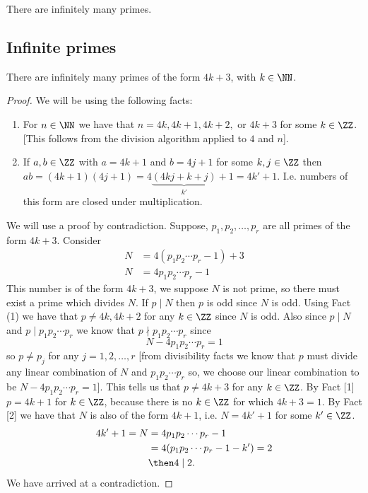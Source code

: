 \documentclass[12pt, a4paper]{article}
\begin{document}
\begin{theorem}[Euclid]
    There are infinitely many primes.
\end{theorem}

\subsection{Infinite primes}

\begin{proposition}
    There are infinitely many primes of the form \(4k+3\), with \(k \in \NN\).
\end{proposition}

\begin{proof}
    We will be using the following facts:
    \begin{enumerate}
        \item For \(n \in \NN\) we have that \(n=4k,4k+1,4k+2,\) or \(4k+3\) for some \(k\in \ZZ\). [This follows from the division algorithm applied to \(4\) and \(n\)].
        \item If \(a,b \in \ZZ\) with \(a=4k+1\) and \(b=4j+1\) for some \(k,j \in \ZZ\) then \(ab=(4k+1)(4j+1)=4 \underbrace{(4kj+k+j)}_{k'}+1 = 4k'+1\). I.e. numbers of this form are closed under multiplication.
    \end{enumerate}
    We will use a proof by contradiction. Suppose, \(p_1,p_2,\ldots, p_r\) are all primes of the form \(4k+3\). Consider 
    \[\begin{aligned}
        N&=4(p_1p_2\cdots p_r - 1) +3 \\
        N&=4p_1p_2\cdots p_r -1 
    \end{aligned}\]
    This number is of the form \(4k+3\), we suppose \(N\) is not prime, so there must exist a prime which divides \(N\). If \(p\mid N\) then \(p\) is odd since \(N\) is odd. Using Fact (1) we have that \(p\neq 4k, 4k +2\) for any \(k \in \ZZ\) since \(N\) is odd. Also since \(p\mid N\) and \(p\mid p_1p_2\cdots p_r\) we know that \(p \nmid p_1p_2\cdots p_r\) since 
    \[N-4p_1p_2\cdots p_r=1\]
    so \(p \neq p_j\) for any \(j=1,2,\ldots, r\) [from divisibility facts we know that \(p\) must divide any linear combination of \(N\) and \(p_1p_2\cdots p_r\) so, we choose our linear combination to be \(N-4p_1p_2\cdots p_r=1\)]. This tells us that \(p\neq 4k+3\) for any \(k \in \ZZ\). By Fact [1] \(p=4k+1\) for \(k\in \ZZ\), because there is no \(k\in \ZZ\) for which \(4k+3 =1\). By Fact [2] we have that \(N\) is also of the form \(4k+1\), i.e. \(N=4k'+1\) for some \(k'\in \ZZ\). 
    \[\begin{aligned}
        4k'+1 = N &= 4p_1p_2\cdots p_r -1 \\
            &=4(p_1p_2\cdots p_r -1-k')= 2\\
            &\then 4\mid 2.
    \end{aligned}\]
    We have arrived at a contradiction.
\end{proof}
\end{document}
